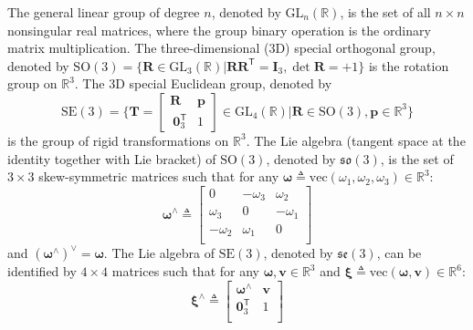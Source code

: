 \documentclass[conference]{IEEEtran}
\newcommand{\transpose}{\mathsf{T}}
\newcommand{\SO}{\mathrm{SO}}
\newcommand{\SE}{\mathrm{SE}}
\newcommand{\GL}{\mathrm{GL}}
\begin{document}
The general linear group of degree $n$, denoted by \mbox{\small{$\GL_n(\mathbb{R})$}}, is the set of all $n\times n$ nonsingular real matrices, where the group binary operation is the ordinary matrix multiplication. The three-dimensional (3D) special orthogonal group, denoted by \mbox{\small{$\SO(3) = \{\mathbf{R}\in \GL_3(\mathbb{R}) | \mathbf{R} \mathbf{R}^\transpose = \mathbf{I}_3, \operatorname{det} \mathbf{R} = +1\}$}} is the rotation group on $\mathbb{R}^3$. The 3D special Euclidean group, denoted by
\begin{equation}
\SE(3) = \{ \mathbf{T} = \left[\begin{array}{cc} \mathbf{R} & \mathbf{p} \\ ~\mathbf{0}_3^\transpose & 1 \end{array} \right] \in \GL_4(\mathbb{R}) | \mathbf{R} \in \SO(3), \mathbf{p} \in \mathbb{R}^3 \}
\end{equation}
is the group of rigid transformations on $\mathbb{R}^3$. The Lie algebra (tangent space at the identity together with Lie bracket) of $\SO(3)$, denoted by $\mathfrak{so}(3)$, is the set of $3\times 3$ skew-symmetric matrices such that for any $\boldsymbol \omega \triangleq \mathrm{vec}(\omega_1, \omega_2, \omega_3) \in \mathbb{R}^3$:
\begin{equation}
 \boldsymbol \omega^\wedge \triangleq 
\begin{bmatrix}
0 & -\omega_3 & \omega_2 \\
\omega_3 & 0 & - \omega_1 \\
-\omega_2 & \omega_1 & 0 \\
\end{bmatrix}
\end{equation}
and $(\boldsymbol \omega^\wedge)^{\vee} = \boldsymbol \omega$. The Lie algebra of $\SE(3)$, denoted by $\mathfrak{se}(3)$, can be identified by $4\times 4$ matrices such that for any $\boldsymbol \omega, \mathbf{v} \in \mathbb{R}^3$ and $\boldsymbol \xi \triangleq \mathrm{vec}(\boldsymbol \omega, \mathbf{v}) \in \mathbb{R}^6$:
\begin{equation}
 \boldsymbol \xi^\wedge \triangleq 
\begin{bmatrix}
\boldsymbol \omega^\wedge & \mathbf{v} \\
\mathbf{0}_3^\transpose & 1 \\
\end{bmatrix}
\end{equation}
\end{document}
